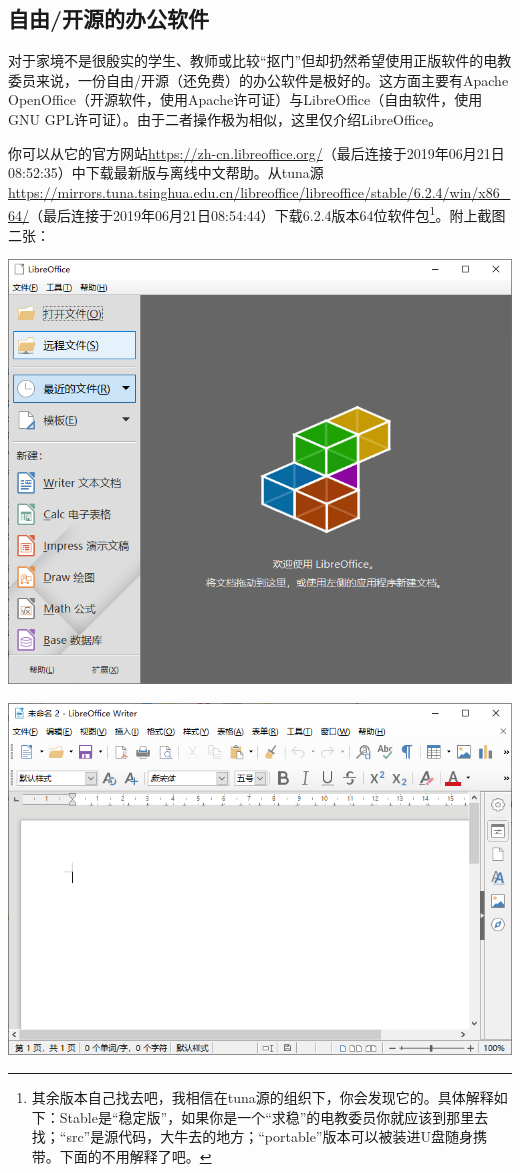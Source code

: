 \subsection{自由/开源的办公软件}
对于家境不是很殷实的学生、教师或比较“抠门”但却扔然希望使用正版软件的电教委员来说，一份自由/开源（还免费）的办公软件是极好的。这方面主要有Apache OpenOffice（开源软件，使用Apache许可证）与LibreOffice（自由软件，使用GNU GPL许可证）。由于二者操作极为相似，这里仅介绍LibreOffice。\par
你可以从它的官方网站\url{https://zh-cn.libreoffice.org/}（最后连接于2019年06月21日08:52:35）中下载最新版与离线中文帮助。从tuna源\url{https://mirrors.tuna.tsinghua.edu.cn/libreoffice/libreoffice/stable/6.2.4/win/x86_64/}（最后连接于2019年06月21日08:54:44）下载6.2.4版本64位软件包\footnote{其余版本自己找去吧，我相信在tuna源的组织下，你会发现它的。具体解释如下：Stable是“稳定版”，如果你是一个“求稳”的电教委员你就应该到那里去找；“src”是源代码，大牛去的地方；“portable”版本可以被装进U盘随身携带。下面的不用解释了吧。}。附上截图二张：
\begin{center}
	\includegraphics[scale=0.7]{pic/loffice_start}
\end{center} \par
\begin{center}
	\includegraphics[scale=0.7]{pic/loffice_wr}
\end{center} \par
